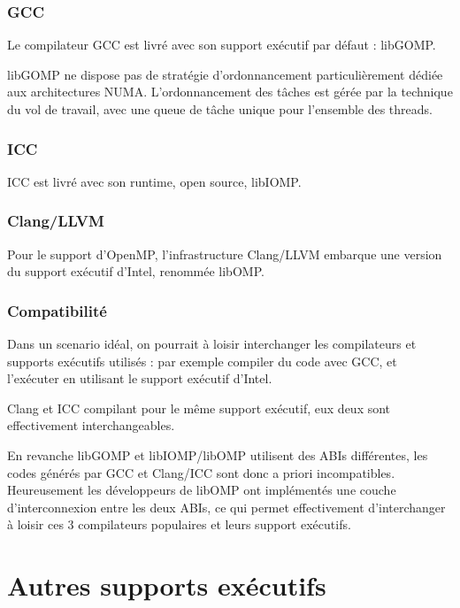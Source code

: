 \subsubsection{GCC}

Le compilateur GCC est livré avec son support exécutif par défaut : libGOMP.

libGOMP ne dispose pas de stratégie d'ordonnancement particulièrement dédiée aux architectures NUMA.
L'ordonnancement des tâches est gérée par la technique du vol de travail, avec une queue de tâche unique pour l'ensemble des threads.



\subsubsection{ICC}

ICC est livré avec son runtime, open source, libIOMP.


\subsubsection{Clang/LLVM}

Pour le support d'OpenMP, l'infrastructure Clang/LLVM embarque une version du support exécutif d'Intel, renommée libOMP.

\subsubsection{Compatibilité}

Dans un scenario idéal, on pourrait à loisir interchanger les compilateurs et supports exécutifs utilisés : par exemple compiler du code avec GCC, et l'exécuter en utilisant le support exécutif d'Intel.

Clang et ICC compilant pour le même support exécutif, eux deux sont effectivement interchangeables.

En revanche libGOMP et libIOMP/libOMP utilisent des ABIs différentes, les codes générés par GCC et Clang/ICC sont donc a priori incompatibles.
Heureusement les développeurs de libOMP ont implémentés une couche d'interconnexion entre les deux ABIs, ce qui permet effectivement d'interchanger à loisir ces 3 compilateurs populaires et leurs support exécutifs.

\section{Autres supports exécutifs}\label{sec:rw:other-runtimes}

